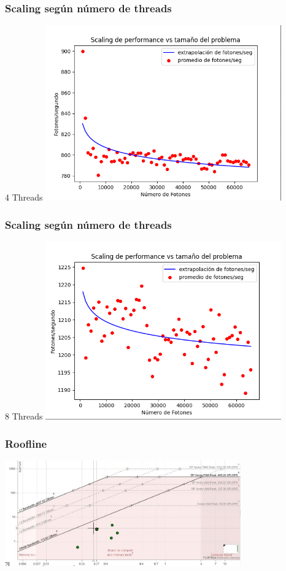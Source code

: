 \documentclass{beamer}
\begin{document}
    \begin{frame}
        \frametitle{Scaling según número de threads}
        4 Threads
        \includegraphics[width=4in]{imagenes/scaling_4threads_alv.png}
    \end{frame}

    \begin{frame}
        \frametitle{Scaling según número de threads}
        8 Threads
        \includegraphics[width=4in]{imagenes/scaling_8threads_alv.png}
    \end{frame}

	\begin{frame}
		\frametitle{Roofline}

		\includegraphics[width=4in]{imagenes/roofline.jpeg}
	\end{frame}
\end{document}
